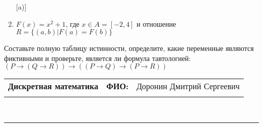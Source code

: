 \documentclass[10pt]{exam}
\newcommand{\class}{Дискретная математика}
\newcommand{\examdate}{}
\begin{document}
\begin{questions}
\begin{enumerate} [a)]
\item $F(x)=x^{2}+1$, где $x \in A = [-2, 4]$ и отношение $R = \{(a,b)|F(a) = F(b)\}$
\end{enumerate}\question Составьте полную таблицу истинности, определите, какие переменные являются фиктивными и проверьте, является ли формула тавтологией:
$(P \rightarrow (Q \rightarrow R)) \rightarrow ((P \rightarrow Q) \rightarrow (P \rightarrow R))$

\end{questions}
\newpage
\begin{flushright}
\begin{tabular}{p{2.8in} r l}
\textbf{\class} & \textbf{ФИО:} &Доронин Дмитрий Сергеевич
\\

\textbf{\examdate} &&\\
\end{tabular}\\
\end{flushright}
\rule[1ex]{\textwidth}{.1pt}
\end{document}

